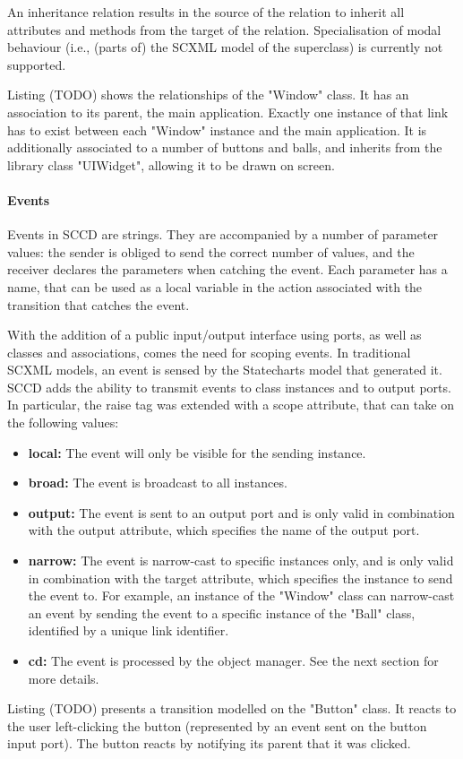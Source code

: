 An inheritance relation results in the source of the relation to inherit all attributes and methods from the target of the 
relation. Specialisation of modal behaviour (i.e., (parts of) the SCXML model of the superclass) is currently not supported.


Listing (TODO) shows the relationships of the "Window" class. It has an association to its parent, the main application. 
Exactly one instance of that link has to exist between each "Window" instance and the main application. It is additionally 
associated to a number of buttons and balls, and inherits from the library class "UIWidget", allowing it to be drawn on screen.

\paragraph{Events}
Events in SCCD are strings. They are accompanied by a number of parameter values: the sender is obliged to send the correct 
number of values, and the receiver declares the parameters when catching the event. Each parameter has a name, that can be used 
as a local variable in the action associated with the transition that catches the event.

With the addition of a public input/output interface using ports, as well as classes and associations, comes the need for 
scoping events. In traditional SCXML models, an event is sensed by the Statecharts model that generated it. SCCD adds the ability 
to transmit events to class instances and to output ports. In particular, the raise tag was extended with a scope attribute, that 
can take on the following values:
\begin{itemize}
    \item \textbf{local:} The event will only be visible for the sending instance.
    \item \textbf{broad:} The event is broadcast to all instances.
    \item \textbf{output:} The event is sent to an output port and is only valid in combination with the output attribute, which 
    specifies the name of the output port.
    \item \textbf{narrow:} The event is narrow-cast to specific instances only, and is only valid in combination with the target 
    attribute, which specifies the instance to send the event to. For example, an instance of the "Window" class can narrow-cast 
    an event by sending the event to a specific instance of the "Ball" class, identified by a unique link identifier.
    \item \textbf{cd:} The event is processed by the object manager. See the next section for more details.
\end{itemize}
Listing (TODO) presents a transition modelled on the "Button" class. It reacts to the user left-clicking the button (represented 
by an event sent on the button input port). The button reacts by notifying its parent that it was clicked.

